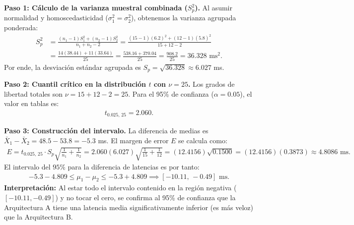 \begin{solproblema}
	\textbf{Paso 1: Cálculo de la varianza muestral combinada ($S_p^2$).}
	Al asumir normalidad y homoscedasticidad ($\sigma_1^2 = \sigma_2^2$), obtenemos la varianza agrupada ponderada:
	\begin{align}
		S_p^2 &= \frac{(n_1 - 1)S_1^2 + (n_2 - 1)S_2^2}{n_1 + n_2 - 2} = \frac{(15 - 1)(6.2)^2 + (12 - 1)(5.8)^2}{15 + 12 - 2} \\
		&= \frac{14(38.44) + 11(33.64)}{25} = \frac{538.16 + 370.04}{25} = \frac{908.2}{25} = 36.328 \text{ ms}^2.
	\end{align}
	Por ende, la desviación estándar agrupada es $S_p = \sqrt{36.328} \approx 6.027$ ms.
	
	\textbf{Paso 2: Cuantil crítico en la distribución $t$ con $\nu = 25$.}
	Los grados de libertad totales son $\nu = 15 + 12 - 2 = 25$. Para el 95\% de confianza ($\alpha = 0.05$), el valor en tablas es:
	\begin{align}
		t_{0.025, \, 25} = 2.060.
	\end{align}
	
	\textbf{Paso 3: Construcción del intervalo.}
	La diferencia de medias es $\bar{X}_1 - \bar{X}_2 = 48.5 - 53.8 = -5.3$ ms. El margen de error $E$ se calcula como:
	\begin{align}
		E = t_{0.025, \, 25} \cdot S_p \sqrt{\frac{1}{n_1} + \frac{1}{n_2}} = 2.060(6.027) \sqrt{\frac{1}{15} + \frac{1}{12}} = (12.4156) \sqrt{0.1500} = (12.4156)(0.3873) \approx 4.8086 \text{ ms.}
	\end{align}
	El intervalo del $95\%$ para la diferencia de latencias es por tanto:
	\begin{align}
		-5.3 - 4.809 \le \mu_1 - \mu_2 \le -5.3 + 4.809 \implies [-10.11, \, -0.49] \text{ ms.}
	\end{align}
	\textbf{Interpretación:} Al estar todo el intervalo contenido en la región negativa ($[-10.11, -0.49]$) y no tocar el cero, se confirma al 95\% de confianza que la Arquitectura A tiene una latencia media significativamente inferior (es más veloz) que la Arquitectura B.
\end{solproblema}

